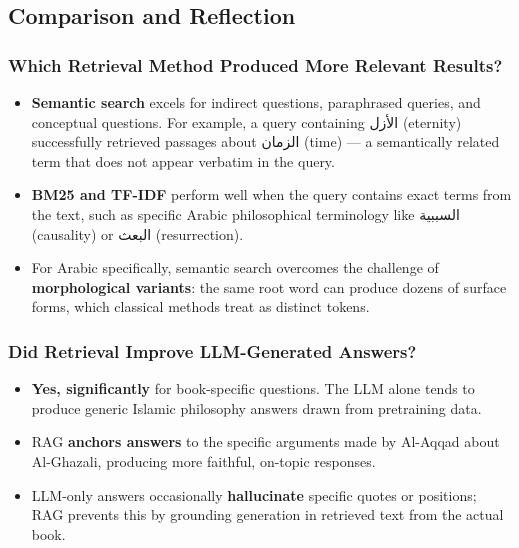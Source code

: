 \subsection{Comparison and Reflection}

\subsubsection{Which Retrieval Method Produced More Relevant Results?}

\begin{itemize}
  \item \textbf{Semantic search} excels for indirect questions, paraphrased queries, and conceptual questions. For example, a query containing \textarabic{الأزل} (eternity) successfully retrieved passages about \textarabic{الزمان} (time) --- a semantically related term that does not appear verbatim in the query.
  \item \textbf{BM25 and TF-IDF} perform well when the query contains exact terms from the text, such as specific Arabic philosophical terminology like \textarabic{السببية} (causality) or \textarabic{البعث} (resurrection).
  \item For Arabic specifically, semantic search overcomes the challenge of \textbf{morphological variants}: the same root word can produce dozens of surface forms, which classical methods treat as distinct tokens.
\end{itemize}

\subsubsection{Did Retrieval Improve LLM-Generated Answers?}

\begin{itemize}
  \item \textbf{Yes, significantly} for book-specific questions. The LLM alone tends to produce generic Islamic philosophy answers drawn from pretraining data.
  \item RAG \textbf{anchors answers} to the specific arguments made by Al-Aqqad about Al-Ghazali, producing more faithful, on-topic responses.
  \item LLM-only answers occasionally \textbf{hallucinate} specific quotes or positions; RAG prevents this by grounding generation in retrieved text from the actual book.
\end{itemize}

